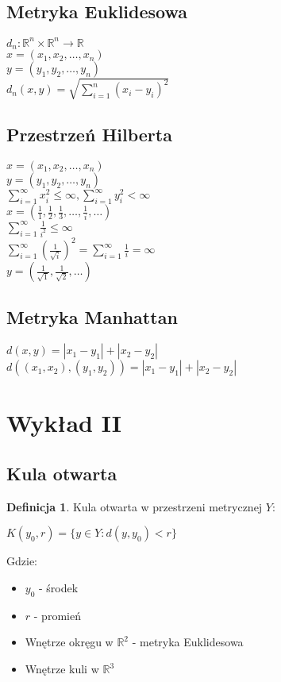 \documentclass{article}
\theoremstyle{definition}
\newtheorem{de}{Definicja}[subsection]
\theoremstyle{definition}
\theoremstyle{definition}
\theoremstyle{definition}
\begin{document}
\subsection{Metryka Euklidesowa}

$d_n: \mathbb{R}^n \times \mathbb{R}^n \rightarrow \mathbb{R}$\\
$x=(x_1,x_2,\dots, x_n)$\\
$y=(y_1,y_2,\dots, y_n)$\\
$d_n(x,y)=\sqrt{\sum_{i=1}^{n} (x_i-y_i)^2}$

\subsection{Przestrzeń Hilberta}

$x=(x_1,x_2,\dots, x_n)$\\
$y=(y_1,y_2,\dots, y_n)$\\
$\sum_{i=1}^{\infty} x_i^2\leq \infty, \sum_{i=1}^{\infty} y_i^2 < \infty$\\
$x=\left(\frac{1}{1},\frac{1}{2},\frac{1}{3},\dots,\frac{1}{i}, \dots \right)$\\
$\sum_{i=1}^{\infty} \frac{1}{i^2} \leq \infty$\\
$\sum_{i=1}^{\infty} \left(\frac{1}{\sqrt{i}}\right)^2=\sum_{i=1}^{\infty} \frac{1}{i} = \infty$\\
$y=\left(\frac{1}{\sqrt{1}},\frac{1}{\sqrt{2}},\dots \right)$

\subsection{Metryka Manhattan}

$d(x,y)=|x_1-y_1| + |x_2-y_2|$\\
$d((x_1,x_2),(y_1,y_2))=|x_1-y_1|+|x_2-y_2|$

\section{Wykład II}

\subsection{Kula otwarta}

\begin{de}
Kula otwarta w przestrzeni metrycznej $Y$:
\begin{center}
    $K(y_0, r) = \{y\in Y: d(y, y_0) < r\}$
\end{center}
Gdzie:
\begin{itemize}
    \item $y_0$ - środek
    \item $r$ - promień
    \item Wnętrze okręgu w $\mathbb{R}^2$ - metryka Euklidesowa
    \item Wnętrze kuli w $\mathbb{R}^3$
\end{itemize}
\end{de}
\end{document}
